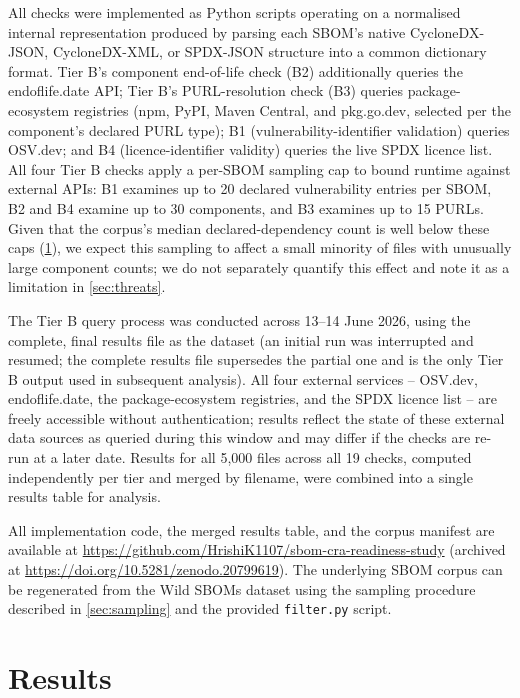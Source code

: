 \documentclass[11pt]{article}
\begin{document}
All checks were implemented as Python scripts operating on a normalised internal representation produced by parsing each SBOM's native CycloneDX-JSON, CycloneDX-XML, or SPDX-JSON structure into a common dictionary format. Tier B's component end-of-life check (B2) additionally queries the endoflife.date API; Tier B's PURL-resolution check (B3) queries package-ecosystem registries (npm, PyPI, Maven Central, and pkg.go.dev, selected per the component's declared PURL type); B1 (vulnerability-identifier validation) queries OSV.dev; and B4 (licence-identifier validity) queries the live SPDX licence list. All four Tier B checks apply a per-SBOM sampling cap to bound runtime against external APIs: B1 examines up to 20 declared vulnerability entries per SBOM, B2 and B4 examine up to 30 components, and B3 examines up to 15 PURLs. Given that the corpus's median declared-dependency count is well below these caps (\cref{sec:results}), we expect this sampling to affect a small minority of files with unusually large component counts; we do not separately quantify this effect and note it as a limitation in \cref{sec:threats}.

The Tier B query process was conducted across 13--14 June 2026, using the complete, final results file as the dataset (an initial run was interrupted and resumed; the complete results file supersedes the partial one and is the only Tier B output used in subsequent analysis). All four external services -- OSV.dev, endoflife.date, the package-ecosystem registries, and the SPDX licence list -- are freely accessible without authentication; results reflect the state of these external data sources as queried during this window and may differ if the checks are re-run at a later date. Results for all 5,000 files across all 19 checks, computed independently per tier and merged by filename, were combined into a single results table for analysis.

All implementation code, the merged results table, and the corpus manifest are available at \url{https://github.com/HrishiK1107/sbom-cra-readiness-study} (archived at \url{https://doi.org/10.5281/zenodo.20799619}). The underlying SBOM corpus can be regenerated from the Wild SBOMs dataset \cite{soeiro2025} using the sampling procedure described in \cref{sec:sampling} and the provided \texttt{filter.py} script.

\section{Results}
\label{sec:results}
\end{document}
